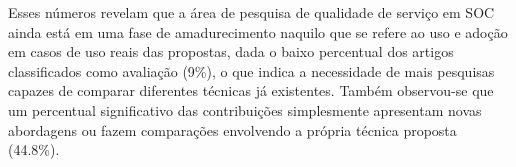 Esses n\'{u}meros revelam que a \'{a}rea de pesquisa de qualidade de servi\c co em SOC ainda est\'{a} em uma fase de amadurecimento naquilo que se refere ao uso e adoção em casos de uso reais das propostas, dada o baixo percentual dos artigos classificados como avaliação (9\%), o que indica a necessidade de mais pesquisas capazes de comparar diferentes técnicas já existentes. Também observou-se que um percentual significativo das contribui\c c\~{o}es simplesmente apresentam novas abordagens ou fazem compara\c c\~{o}es envolvendo a pr\'{o}pria t\'{e}cnica proposta (44.8\%).%